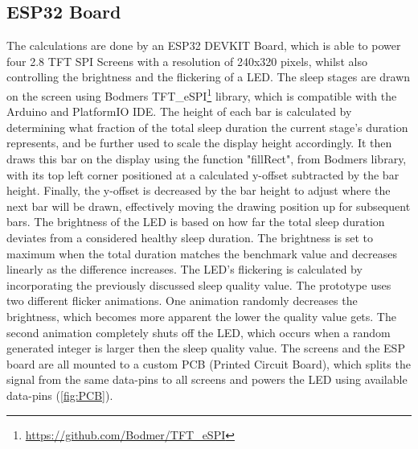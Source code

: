 \documentclass[
  a4paper,  %
  twoside,  %
  bibliography=totoc,
  headsepline,
  cleardoublepage=empty,
  parskip=half,
  draft=false
]{scrbook}
\begin{document}
\subsection{ESP32 Board}
The calculations are done by an ESP32 DEVKIT Board, which is able to power four 2.8 TFT SPI Screens with a resolution of 240x320 pixels, whilst also controlling the brightness and the flickering of a LED. The sleep stages are drawn on the screen using Bodmers TFT\_eSPI\footnote{\url{https://github.com/Bodmer/TFT_eSPI}} library, which is compatible with the Arduino and PlatformIO IDE. The height of each bar is calculated by determining what fraction of the total sleep duration the current stage's duration represents, and be further used to scale the display height accordingly. It then draws this bar on the display using the function "fillRect", from Bodmers library, with its top left corner positioned at a calculated y-offset subtracted by the bar height. Finally, the y-offset is decreased by the bar height to adjust where the next bar will be drawn, effectively moving the drawing position up for subsequent bars. The brightness of the LED is based on how far the total sleep duration deviates from a considered healthy sleep duration. The brightness is set to maximum when the total duration matches the benchmark value and decreases linearly as the difference increases. The LED's flickering is calculated by incorporating the previously discussed sleep quality value. The prototype uses two different flicker animations. One animation randomly decreases the brightness, which becomes more apparent the lower the quality value gets. The second animation completely shuts off the LED, which occurs when a random generated integer is larger then the sleep quality value. The screens and the ESP board are all mounted to a custom PCB (Printed Circuit Board), which splits the signal from the same data-pins to all screens and powers the LED using available data-pins (\autoref{fig:PCB}).
\end{document}

